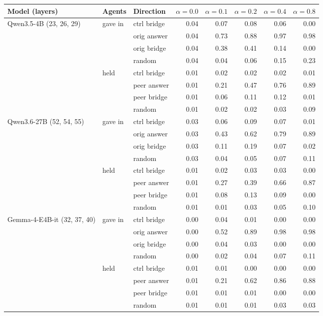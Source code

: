 \begin{tabular}{lllrrrrr}
\toprule
Model (layers) & Agents & Direction & $\alpha{=}0.0$ & $\alpha{=}0.1$ & $\alpha{=}0.2$ & $\alpha{=}0.4$ & $\alpha{=}0.8$ \\
\midrule
Qwen3.5-4B (23, 26, 29) & gave in & ctrl bridge & 0.04 & 0.07 & 0.08 & 0.06 & 0.00 \\
 &  & orig answer & 0.04 & 0.73 & 0.88 & 0.97 & 0.98 \\
 &  & orig bridge & 0.04 & 0.38 & 0.41 & 0.14 & 0.00 \\
 &  & random & 0.04 & 0.04 & 0.06 & 0.15 & 0.23 \\
 & held & ctrl bridge & 0.01 & 0.02 & 0.02 & 0.02 & 0.01 \\
 &  & peer answer & 0.01 & 0.21 & 0.47 & 0.76 & 0.89 \\
 &  & peer bridge & 0.01 & 0.06 & 0.11 & 0.12 & 0.01 \\
 &  & random & 0.01 & 0.02 & 0.02 & 0.03 & 0.09 \\
\midrule
Qwen3.6-27B (52, 54, 55) & gave in & ctrl bridge & 0.03 & 0.06 & 0.09 & 0.07 & 0.01 \\
 &  & orig answer & 0.03 & 0.43 & 0.62 & 0.79 & 0.89 \\
 &  & orig bridge & 0.03 & 0.11 & 0.19 & 0.07 & 0.02 \\
 &  & random & 0.03 & 0.04 & 0.05 & 0.07 & 0.11 \\
 & held & ctrl bridge & 0.01 & 0.02 & 0.03 & 0.03 & 0.00 \\
 &  & peer answer & 0.01 & 0.27 & 0.39 & 0.66 & 0.87 \\
 &  & peer bridge & 0.01 & 0.08 & 0.13 & 0.09 & 0.00 \\
 &  & random & 0.01 & 0.01 & 0.03 & 0.05 & 0.10 \\
\midrule
Gemma-4-E4B-it (32, 37, 40) & gave in & ctrl bridge & 0.00 & 0.04 & 0.01 & 0.00 & 0.00 \\
 &  & orig answer & 0.00 & 0.52 & 0.89 & 0.98 & 0.98 \\
 &  & orig bridge & 0.00 & 0.04 & 0.03 & 0.00 & 0.00 \\
 &  & random & 0.00 & 0.02 & 0.04 & 0.07 & 0.11 \\
 & held & ctrl bridge & 0.01 & 0.01 & 0.00 & 0.00 & 0.00 \\
 &  & peer answer & 0.01 & 0.21 & 0.62 & 0.86 & 0.88 \\
 &  & peer bridge & 0.01 & 0.01 & 0.01 & 0.00 & 0.00 \\
 &  & random & 0.01 & 0.01 & 0.01 & 0.03 & 0.03 \\

\end{tabular}
